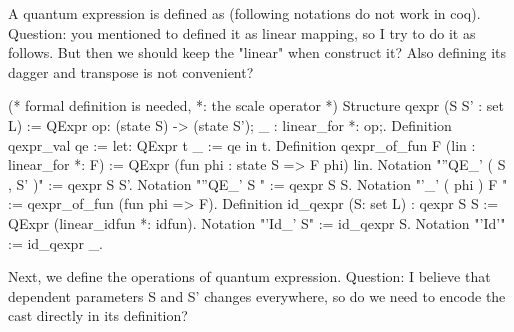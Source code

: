     \vspace{-0.5cm}
    A quantum expression is defined as (following notations do not work in coq). Question: you mentioned to defined it as linear mapping, so I try to do it as follows. But then we should keep the "linear" when construct it? Also defining its dagger and transpose is not convenient?
    \begin{coq}
        (* formal definition is needed, *: the scale operator *)
        Structure qexpr (S S' : {set L}) := QExpr {op: (state S) -> (state S'); _ : linear_for *: op;}.
        Definition qexpr_val qe := let: QExpr t _ := qe in t.
        Definition qexpr_of_fun F (lin : linear_for *: F) := QExpr (fun phi : state S => F phi) lin.
        Notation "''QE_' ( S , S' )" := qexpr S S'.
        Notation "''QE_' S " := qexpr S S.
        Notation "'\qexpr_' ( phi ) F " := qexpr_of_fun (fun phi => F).
        Definition id_qexpr (S: {set L}) : qexpr S S := QExpr (linear_idfun *: idfun).
        Notation "'Id_' S" := id_qexpr S.
        Notation "'Id'" := id_qexpr _.
    \end{coq}
    \vspace{-0.5cm}
    Next, we define the operations of quantum expression. Question: I believe that dependent parameters S and S' changes everywhere, so do we need to encode the cast directly in its definition?
